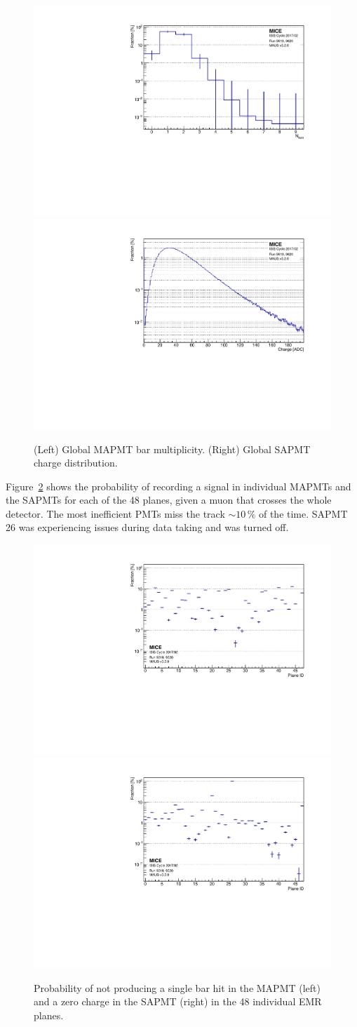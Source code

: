 \begin{figure}[htb!]
	\begin{center}
		\includegraphics[width=0.49\columnwidth]{nbars.pdf}
		\hfill
		\includegraphics[width=0.49\columnwidth]{charge.pdf}
		\caption{(Left) Global MAPMT bar multiplicity. (Right) Global SAPMT charge distribution.}
		\label{fig:emr_eff}
	\end{center}
\end{figure}

Figure~\ref{fig:emr_plane_eff} shows the probability of recording a signal in individual MAPMTs and the SAPMTs for each of the 48 planes, given a muon that crosses the whole detector. The most inefficient PMTs miss the track $\sim10\,\%$ of the time. SAPMT 26 was experiencing issues during data taking and was turned off.

\begin{figure}[htb!]
	\begin{center}
		\includegraphics[width=0.49\columnwidth]{missed_mapmt.pdf}
		\hfill
		\includegraphics[width=0.49\columnwidth]{missed_sapmt.pdf}
		\caption{Probability of not producing a single bar hit in the MAPMT (left) and a zero charge in the SAPMT (right) in the 48 individual EMR planes.}
		\label{fig:emr_plane_eff}
	\end{center}
\end{figure}

